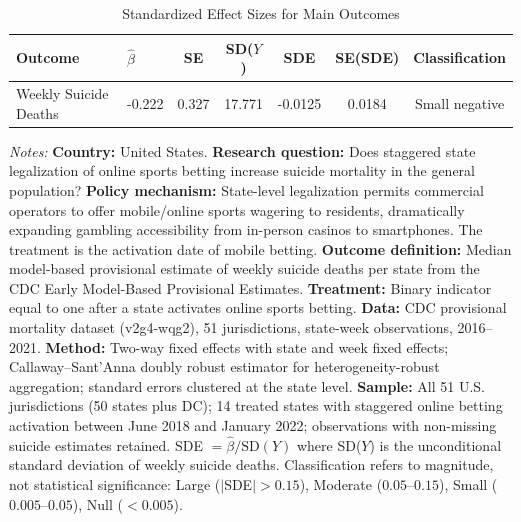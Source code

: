 \begin{table}[H]
\centering
\caption{Standardized Effect Sizes for Main Outcomes}
\label{tab:sde}
\begin{threeparttable}
\begin{tabular}{llccccc}
\toprule
Outcome & $\hat{\beta}$ & SE & SD($Y$) & SDE & SE(SDE) & Classification \\
\midrule
Weekly Suicide Deaths & -0.222 & 0.327 & 17.771 & -0.0125 & 0.0184 & Small negative \\
\bottomrule
\end{tabular}
\begin{tablenotes}[flushleft]
\small
\item \textit{Notes:} \textbf{Country:} United States. \textbf{Research question:} Does staggered state legalization of online sports betting increase suicide mortality in the general population? \textbf{Policy mechanism:} State-level legalization permits commercial operators to offer mobile/online sports wagering to residents, dramatically expanding gambling accessibility from in-person casinos to smartphones. The treatment is the activation date of mobile betting. \textbf{Outcome definition:} Median model-based provisional estimate of weekly suicide deaths per state from the CDC Early Model-Based Provisional Estimates. \textbf{Treatment:} Binary indicator equal to one after a state activates online sports betting. \textbf{Data:} CDC provisional mortality dataset (v2g4-wqg2), 51 jurisdictions, state-week observations, 2016--2021. \textbf{Method:} Two-way fixed effects with state and week fixed effects; Callaway--Sant'Anna doubly robust estimator for heterogeneity-robust aggregation; standard errors clustered at the state level. \textbf{Sample:} All 51 U.S. jurisdictions (50 states plus DC); 14 treated states with staggered online betting activation between June 2018 and January 2022; observations with non-missing suicide estimates retained. SDE $= \hat{\beta} / \text{SD}(Y)$ where SD($Y$) is the unconditional standard deviation of weekly suicide deaths. Classification refers to magnitude, not statistical significance: Large ($|$SDE$| > 0.15$), Moderate ($0.05$--$0.15$), Small ($0.005$--$0.05$), Null ($< 0.005$).
\end{tablenotes}
\end{threeparttable}
\end{table}

